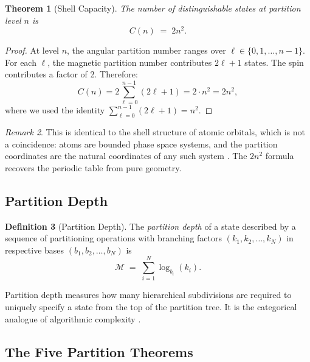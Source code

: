 \documentclass[11pt,twocolumn,a4paper]{article}
\theoremstyle{plain}
\newtheorem{theorem}{Theorem}[section]
\theoremstyle{definition}
\newtheorem{definition}[theorem]{Definition}
\theoremstyle{remark}
\newtheorem{remark}[theorem]{Remark}
\newcommand{\Depth}{\mathcal{M}}
\begin{document}
\begin{theorem}[Shell Capacity]
\label{thm:shell_capacity}
The number of distinguishable states at partition level $n$ is
\begin{equation}
C(n) \;=\; 2n^2.
\label{eq:cn}
\end{equation}
\end{theorem}

\begin{proof}
At level $n$, the angular partition number ranges over $\ell \in \{0, 1, \ldots, n-1\}$. For each $\ell$, the magnetic partition number contributes $2\ell + 1$ states. The spin contributes a factor of 2. Therefore:
\begin{equation}
C(n) = 2 \sum_{\ell=0}^{n-1} (2\ell + 1) = 2 \cdot n^2 = 2n^2,
\label{eq:cn_proof}
\end{equation}
where we used the identity $\sum_{\ell=0}^{n-1}(2\ell+1) = n^2$.
\end{proof}

\begin{remark}
This is identical to the shell structure of atomic orbitals, which is not a coincidence: atoms are bounded phase space systems, and the partition coordinates are the natural coordinates of any such system \cite{sachikonye2026partition}. The $2n^2$ formula recovers the periodic table from pure geometry.
\end{remark}

\subsection{Partition Depth}

\begin{definition}[Partition Depth]
\label{def:partition_depth}
The \emph{partition depth} of a state described by a sequence of partitioning operations with branching factors $(k_1, k_2, \ldots, k_N)$ in respective bases $(b_1, b_2, \ldots, b_N)$ is
\begin{equation}
\Depth \;=\; \sum_{i=1}^{N} \log_{b_i}(k_i).
\label{eq:depth}
\end{equation}
\end{definition}

Partition depth measures how many hierarchical subdivisions are required to uniquely specify a state from the top of the partition tree. It is the categorical analogue of algorithmic complexity \cite{li2008kolmogorov, cover2006elements}.

\subsection{The Five Partition Theorems}
\end{document}
